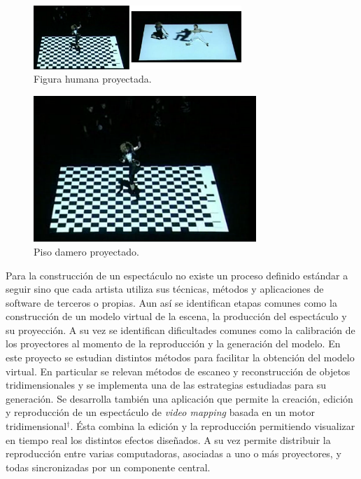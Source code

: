 \begin{minipage}{0.50\textwidth}
\begin{flushleft} \large
\begin{figure}[H]
  \centering
    \includegraphics[width=0.7\textwidth]{./Cap1_intro/instalacionHumano1.png}
  \caption[http://vimeo.com/2774865]{Figura humana proyectada.}
  \label{fig:instalacionHumano1}
\end{figure}
\end{flushleft}
\end{minipage}
\begin{minipage}{0.50\textwidth}
\begin{flushright} \large
\begin{figure}[H]
  \centering
    \includegraphics[width=0.75\textwidth]{./Cap1_intro/instalacionHumano4.png}
  \caption[http://vimeo.com/2774865]{Piso damero proyectado.}
  \label{fig:instalacionHumano2}
\end{figure}
\end{flushright}
\end{minipage}

Para la construcción de un espectáculo no existe un proceso definido estándar a seguir sino que cada artista utiliza sus técnicas, métodos y aplicaciones de software de terceros o propias. Aun así se identifican etapas comunes como la construcción de un modelo virtual de la escena, la producción del espectáculo y su proyección. A su vez se identifican dificultades comunes como la calibración de los proyectores al momento de la reproducción y la generación del modelo.
En este proyecto se estudian distintos métodos para facilitar la obtención del modelo virtual. En particular se relevan métodos de escaneo y reconstrucción de objetos tridimensionales y se implementa una de las estrategias estudiadas para su generación.
Se desarrolla también una aplicación que permite la creación, edición y reproducción de un espectáculo de \emph{video mapping} basada en un motor tridimensional$^\dagger$. Ésta combina la edición y la reproducción permitiendo visualizar en tiempo real los distintos efectos diseñados. A su vez permite distribuir la reproducción entre varias computadoras, asociadas a uno o más proyectores, y todas sincronizadas por un componente central.

